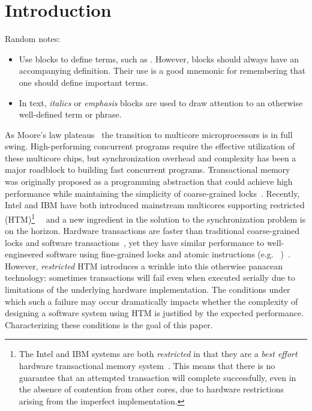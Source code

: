 \section{Introduction}
Random notes:
\begin{itemize}
\item Use  blocks to define terms, such as 
.  However,  
blocks should always have an accompanying definition.  Their
use is a good mnemonic for remembering that one should define
important terms.
\item In text, \textit{italics} or \emph{emphasis} blocks
are used to draw attention to an otherwise well-defined term
or phrase.  
\end{itemize}


As Moore's law plateaus~\cite{Vardi14} the transition
to multicore microprocessors is in full swing. High-performing concurrent
programs require the effective utilization of these multicore chips, but 
synchronization overhead and complexity has been a
major roadblock to building fast concurrent programs.
Transactional memory~\cite{HerlihyMo93} was originally
proposed as a programming abstraction that could achieve
high performance while maintaining the simplicity of 
coarse-grained locks~\cite{YooHuLa13}.
Recently, Intel and IBM
have both introduced mainstream 
multicores supporting restricted  (HTM)\footnote{The Intel and IBM
systems are both \emph{restricted} in that they are 
a \emph{best effort} hardware transactional
memory system~\cite{YooHuLa13}.  This means that there is no 
guarantee that an attempted
transaction will complete successfully, even in the absence 
of contention from other cores, due to hardware restrictions
arising from the imperfect implementation.}~\cite{YooHuLa13}~\cite{LeGuWi15}
and a new ingredient in the solution 
to the synchronization problem is
on the horizon. Hardware transactions are faster than traditional
coarse-grained locks and software transactions~\cite{YooHuLa13}, 
yet they have similar performance to well-engineered software
using fine-grained locks and atomic instructions (e.g.
~\cite{Herlihy91})~\cite{YooHuLa13}. 
However, \emph{restricted} HTM introduces a wrinkle into 
this otherwise panacean technology: sometimes transactions
will fail even when executed serially due to limitations
of the underlying hardware implementation.  The conditions
under which such a failure may occur dramatically impacts
whether the complexity of designing a software system using HTM
is justified by the expected performance.  Characterizing
these conditions is the goal of this paper. 

